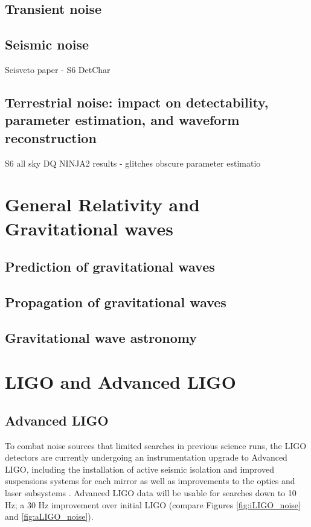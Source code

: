 \subsection{Transient noise}
\subsection{Seismic noise}
Seisveto paper - S6 DetChar 
\subsection{Terrestrial noise: impact on detectability, parameter estimation, and waveform reconstruction }
S6 all sky DQ 
NINJA2 results - glitches obscure parameter estimatio


%
\section{General Relativity and Gravitational waves} 
\subsection{Prediction of gravitational waves} 
\subsection{Propagation of gravitational waves}
\subsection{Gravitational wave astronomy}

%
\section{LIGO and Advanced LIGO}

 
\subsection{Advanced LIGO}

To combat noise sources that limited \gw{}  searches in previous science runs, the LIGO detectors are currently undergoing an instrumentation upgrade to Advanced LIGO, including the installation of active seismic isolation and improved suspensions systems for each mirror as well as improvements to the optics and laser subsystems \cite{Harry-aLIGO}. Advanced LIGO data will be usable for \gw{}  searches down to 10 Hz; a 30 Hz improvement over initial LIGO (compare Figures \ref{fig:iLIGO_noise} and \ref{fig:aLIGO_noise}). 

